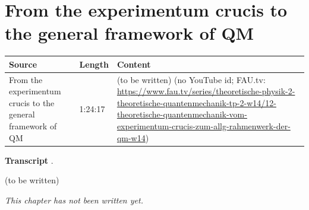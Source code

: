\chapter{From the experimentum crucis to the general framework of QM}\label{ch:c12}
\begin{paracol}{2}

\begin{sources}
\begin{tabularx}{\linewidth}{@{}l l L@{}}
\toprule
\textbf{Source} & \textbf{Length} & \textbf{Content}\\
\midrule
From the experimentum crucis to the general framework of QM & 1:24:17 & (to be written) (no YouTube id; FAU.tv: \url{https://www.fau.tv/series/theoretische-physik-2-theoretische-quantenmechanik-tp-2-w14/12-theoretische-quantenmechanik-vom-experimentum-crucis-zum-allg-rahmenwerk-der-qm-w14})\\
\bottomrule
\end{tabularx}

\smallskip
\textbf{Transcript} .
\end{sources}

\begin{reading}
(to be written)
\end{reading}

\emph{This chapter has not been written yet.}

\flushside
\end{paracol}
